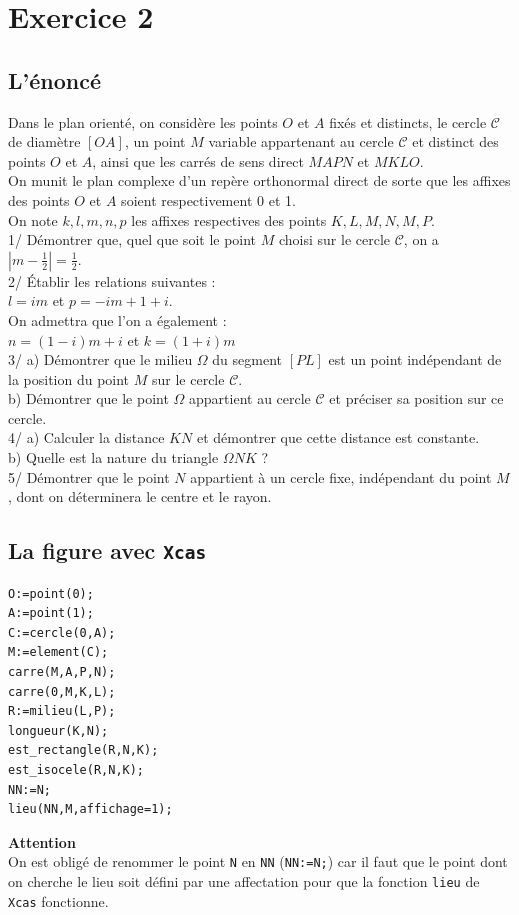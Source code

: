 \documentclass[a4paper,11pt]{book}
\begin{document}
\section{Exercice 2}
\subsection{L'\'enonc\'e}
Dans le plan orient\'e, on consid\`ere les points $O$ et $A$ fix\'es et
distincts, le cercle $\mathcal C$ de diam\`etre $[OA]$, un point $M$ variable
appartenant au cercle $\mathcal C$ et distinct des points $O$ et $A$, ainsi 
que les carr\'es  de sens direct $MAPN$ et $MKLO$.\\
On munit le plan complexe d'un rep\`ere orthonormal direct de sorte que les
affixes des points $O$ et $A$ soient respectivement 0 et 1.\\
On note $k,l,m,n,p$ les affixes respectives des points $K,L,M,N,M,P$.\\
1/ D\'emontrer que, quel que soit le point $M$ choisi sur le cercle 
$\mathcal C$, on a $|m-\frac{1}{2}|=\frac{1}{2}$.\\
2/ \'Etablir les relations suivantes :\\
$l=im$ et $p=-im+1+i$.\\
On admettra que l'on a \'egalement :\\
$n=(1-i)m+i$ et $k=(1+i)m$\\
3/ a) D\'emontrer que le milieu $\Omega$ du segment $[PL]$ est un point 
ind\'ependant de la position du point $M$ sur le cercle $\mathcal C$.\\
\hspace*{1cm} b) D\'emontrer que le point $\Omega$ appartient
 au cercle $\mathcal C$ et pr\'eciser sa position sur ce cercle.\\
4/ a) Calculer la distance $KN$ et d\'emontrer que cette distance est 
constante.\\ 
\hspace*{1cm} b) Quelle est la nature du triangle $\Omega NK$ ?\\
5/ D\'emontrer que le point $N$ appartient \`a un cercle fixe, ind\'ependant 
du point $M$, dont on d\'eterminera le centre et le rayon.\\
\subsection{La figure avec {\tt Xcas}}
\begin{verbatim}
O:=point(0);
A:=point(1);
C:=cercle(0,A);
M:=element(C);
carre(M,A,P,N);
carre(0,M,K,L);
R:=milieu(L,P);
longueur(K,N);
est_rectangle(R,N,K);
est_isocele(R,N,K);
NN:=N;
lieu(NN,M,affichage=1);
\end{verbatim}
{\bf Attention}\\
On est oblig\'e de renommer le point {\tt N} en {\tt NN} ({\tt NN:=N;}) car il 
faut que le point dont on cherche le lieu soit d\'efini par une affectation 
pour que la fonction {\tt lieu} de {\tt Xcas} fonctionne.
\end{document}
